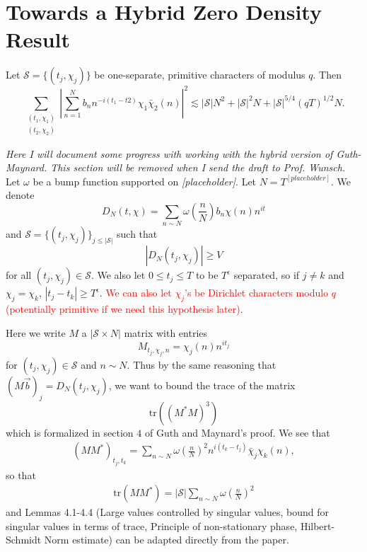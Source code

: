 \section{Towards a Hybrid Zero Density Result}
\begin{theorem}
    \label{heathbrown}
    Let $\mathcal{S}=\{(t_j,\chi_j)\}$ be one-separate, primitive characters of modulus $q$. Then 
    \[
        \sum_{\substack{(t_1,\chi_1)\\(t_2,\chi_2)}}\left|\sum_{n=1}^{N} b_n n^{-i(t_1-t2)}\chi_1\bar{\chi}_2(n)\right|^2 \lesssim  |\mathcal{S}|N^2+ |\mathcal{S}|^2N + |\mathcal{S}|^{5/4}(qT)^{1/2}N.
    \]
\end{theorem}
\textit{Here I will document some progress with working with
the hybrid version of Guth-Maynard. This section will be removed when I send the draft to Prof. Wunsch.}
Let $\omega$ be a bump function supported on \textit{[placeholder]}. Let $N=T^{[placeholder]}$. We denote \[
D_N(t,\chi) = \sum_{n\sim N} \omega\left(\frac{n}{N}\right)b_n \chi(n) n^{it}
\]
and $\mathcal{S}=\{(t_j,\chi_j)\}_{j\leq |\mathcal{S}|}$ such that 
\[
    |D_N(t_j,\chi_j)|\geq V
\]
for all $(t_j,\chi_j)\in\mathcal{S}$.
We also let $0\leq t_j\leq T$ to be $T^\epsilon$ separated, so if 
$j\neq k$ and $\chi_j=\chi_k$, $|t_j-t_k|\geq T^\epsilon$. \textcolor{red}{We can also
let $\chi_j$'s be Dirichlet characters modulo $q$ (potentially primitive if we need this hypothesis later).}

Here we write $M$ a $|\mathcal{S}\times N|$ matrix with entries
\[
    M_{t_j,\chi_j,n} = \chi_j(n)n^{it_j}
\]
for $(t_j,\chi_j)\in\mathcal{S}$ and $n\sim N$.
Thus by the same reasoning that $(M\vec{b})_j=D_N(t_j,\chi_j)$,
we want to bound the trace of the matrix \[
\textrm{tr}((M^*M)^3)
\]
which is formalized in section $4$ of Guth and Maynard's proof.
We see that \begin{align*}
    (MM^*)_{t_j,t_k} = \sum_{n\sim N} \omega\left(\frac{n}{N}\right)^2 n^{i(t_k-t_j)}\bar{\chi}_j\chi_k(n),
\end{align*}
so that \begin{align*}
    \textrm{tr}(MM^*) = |\mathcal{S}|\sum_{n\sim N} \omega\left(\frac{n}{N}\right)^2
\end{align*}
and Lemmas 4.1-4.4 (Large values controlled by singular values, bound for singular values in terms of trace,
Principle of non-stationary phase, Hilbert-Schmidt Norm estimate) can be adapted directly from the paper.

